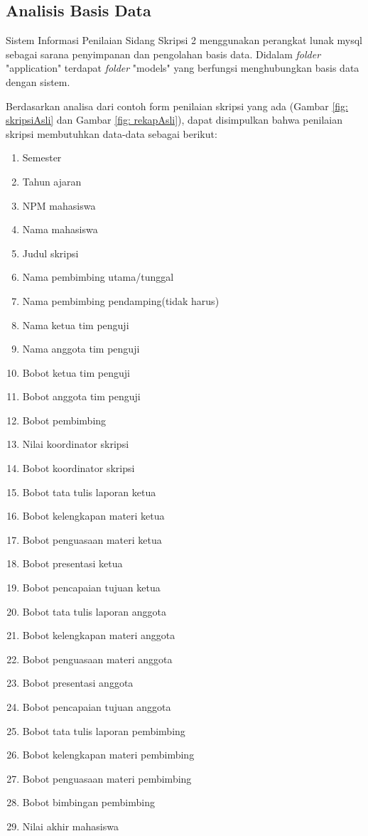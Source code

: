 	\subsection{Analisis Basis Data}
	\label{sub: analisisDatabase}
	
	Sistem Informasi Penilaian Sidang Skripsi 2 menggunakan perangkat lunak mysql sebagai sarana penyimpanan dan pengolahan basis data. Didalam \textit{folder} "application" terdapat \textit{folder} "models" yang berfungsi menghubungkan basis data dengan sistem. 
	
	Berdasarkan analisa dari contoh form penilaian skripsi yang ada (Gambar \ref{fig: skripsiAsli} dan Gambar \ref{fig: rekapAsli}), dapat disimpulkan bahwa penilaian skripsi membutuhkan data-data sebagai berikut:
		
		\begin{enumerate}
			\item Semester
			\item Tahun ajaran
			\item NPM mahasiswa 
			\item Nama mahasiswa
			\item Judul skripsi
			\item Nama pembimbing utama/tunggal
			\item Nama pembimbing pendamping(tidak harus)
			\item Nama ketua tim penguji
			\item Nama anggota tim penguji
			\item Bobot ketua tim penguji
			\item Bobot anggota tim penguji
			\item Bobot pembimbing
			\item Nilai koordinator skripsi
			\item Bobot koordinator skripsi
			\item Bobot tata tulis laporan ketua
			\item Bobot kelengkapan materi ketua
			\item Bobot penguasaan materi ketua
			\item Bobot presentasi ketua
			\item Bobot pencapaian tujuan ketua
			\item Bobot tata tulis laporan anggota
			\item Bobot kelengkapan materi anggota
			\item Bobot penguasaan materi anggota
			\item Bobot presentasi anggota
			\item Bobot pencapaian tujuan anggota
			\item Bobot tata tulis laporan pembimbing
			\item Bobot kelengkapan materi pembimbing
			\item Bobot penguasaan materi pembimbing
			\item Bobot bimbingan pembimbing
			\item Nilai akhir mahasiswa
		\end{enumerate}
	
